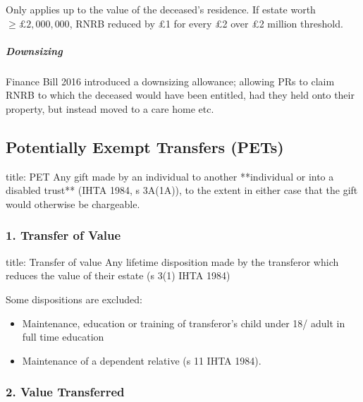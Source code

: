 \documentclass[
]{article}
\newenvironment{Shaded}{}{}
\newcommand{\NormalTok}[1]{#1}
\providecommand{\tightlist}{%
  \setlength{\itemsep}{0pt}\setlength{\parskip}{0pt}}
\begin{document}
Only applies up to the value of the deceased's residence. If estate
worth \(\geq £2,000,000\), RNRB reduced by £1 for every £2 over £2
million threshold.

\hypertarget{downsizing}{%
\subparagraph{Downsizing}\label{downsizing}}

Finance Bill 2016 introduced a downsizing allowance; allowing PRs to
claim RNRB to which the deceased would have been entitled, had they held
onto their property, but instead moved to a care home etc.

\hypertarget{potentially-exempt-transfers-pets}{%
\subsection{Potentially Exempt Transfers
(PETs)}\label{potentially-exempt-transfers-pets}}

\begin{Shaded}
\begin{Highlighting}[]
\NormalTok{title: PET}
\NormalTok{Any gift made by an individual to another **individual or into a disabled trust** (IHTA 1984, s 3A(1A)), to the extent in either case that the gift would otherwise be chargeable.}
\end{Highlighting}
\end{Shaded}

\hypertarget{transfer-of-value-1}{%
\subsubsection{1. Transfer of Value}\label{transfer-of-value-1}}

\begin{Shaded}
\begin{Highlighting}[]
\NormalTok{title: Transfer of value}
\NormalTok{Any lifetime disposition made by the transferor which reduces the value of their estate (s 3(1) IHTA 1984)}
\end{Highlighting}
\end{Shaded}

Some dispositions are excluded:

\begin{itemize}
\tightlist
\item
  Maintenance, education or training of transferor's child under 18/
  adult in full time education
\item
  Maintenance of a dependent relative (s 11 IHTA 1984).
\end{itemize}

\hypertarget{value-transferred-1}{%
\subsubsection{2. Value Transferred}\label{value-transferred-1}}
\end{document}
